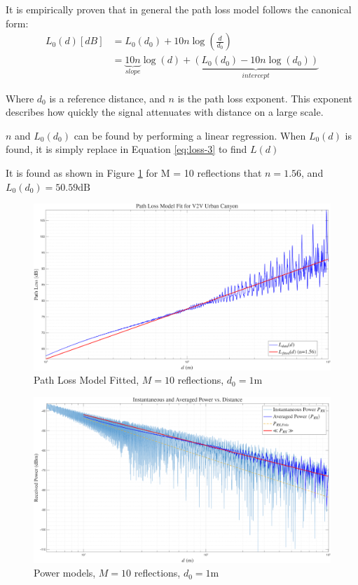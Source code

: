 It is empirically proven that in general the path loss model follows the canonical form:
\begin{align}
	L_{0}(d) [dB] &= L_0(d_0) + 10n \log\left(\frac{d}{d_0}\right)\\
				&= \underbrace{10n}_{slope} \log(d) + \underbrace{(L_0(d_0) - 10n \log(d_0))}_{intercept} \label{eq:lin-reg}
\end{align}


Where $d_0$ is a reference distance, and $n$ is the path loss exponent. This exponent describes how quickly the signal attenuates with distance on a large scale.

$n$ and $L_0(d_0)$ can be found by performing a linear regression. When $L_0(d)$ is found, it is simply replace in Equation \ref{eq:loss-3} to find $L(d)$

It is found as shown in Figure \ref{fig:path-loss-model-fit-m10} for M = 10 reflections that $n = 1.56$, and $L_0(d_0) = 50.59 \mathrm{dB}$
\begin{figure}[H]
	\centering
	\includegraphics[width=1\linewidth]{"content/4-images/Path Loss Model Fit M=10"}
	\caption{Path Loss Model Fitted, $M = 10$ reflections, $d_0 = 1$m}
	\label{fig:path-loss-model-fit-m10}
\end{figure}


\begin{figure}
	\centering
	\includegraphics[width=\linewidth]{"content/4-images/Instantaneous vs average M=10"}
	\caption{Power models, $M = 10$ reflections, $d_0 = 1$m}
	\label{fig:instantaneous-vs-average-m10}
\end{figure}







